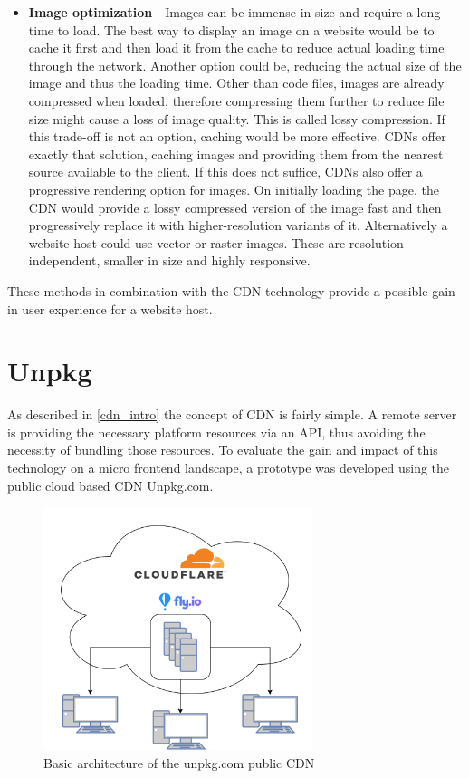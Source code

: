 \begin{itemize}
	\item \textbf{Image optimization} - Images can be immense in size and require a long time to load. The best way to display an image on a website would be to cache it first and then load it from the cache to reduce actual loading time through the network. Another option could be, reducing the actual size of the image and thus the loading time.
	Other than code files, images are already compressed when loaded, therefore compressing them further to reduce file size might cause a loss of image quality. This is called lossy compression. If this trade-off is not an option, caching would be more effective.
	CDNs offer exactly that solution, caching images and providing them from the nearest source available to the client. If this does not suffice, CDNs also offer a progressive rendering option for images. On initially loading the page, the CDN would provide a lossy compressed version of the image fast and then progressively replace it with higher-resolution variants of it.
	Alternatively a website host could use vector or raster images. These are resolution independent, smaller in size and highly responsive.  
\end{itemize}

These methods in combination with the CDN technology provide a possible gain in user experience for a website host. \cite{cdn_fe_opt}
\section{Unpkg}

As described in \ref{cdn_intro} the concept of CDN is fairly simple. A remote server is providing the necessary platform resources via an API, thus avoiding the necessity of bundling those resources.
To evaluate the gain and impact of this technology on a micro frontend landscape, a prototype was developed using the public cloud based CDN Unpkg.com.

\begin{figure}[!h]
	\centering
	\includegraphics[width=0.7\textwidth]{Figures/cdn_unpkg.drawio.png}
	\caption{Basic architecture of the unpkg.com public CDN}
	\label{fig:unpkg_architecture}
\end{figure}

